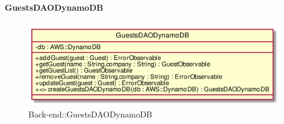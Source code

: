 \hypertarget{GuestsDAODynamoDB_label}{\paragraph{GuestsDAODynamoDB}}
\begin{figure}[h]
	\centering
	\includegraphics[width=\textwidth,height=\textheight,keepaspectratio]{images/ClassGuestsDAODynamoDB.png}
	\caption{Back-end::GuestsDAODynamoDB}
\end{figure}
